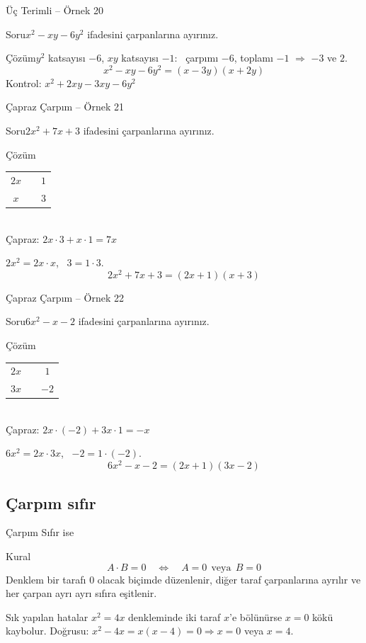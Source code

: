 \documentclass[aspectratio=169,11pt,handout]{beamer}
\newcommand{\soru}[3]{%
\begin{frame}{#1}
  \begin{block}{Soru}\large #2\end{block}
  \pause
  \begin{exampleblock}{Çözüm}\large #3\end{exampleblock}
\end{frame}}
\begin{document}
\soru{Üç Terimli -- Örnek 20}
{\(x^2-xy-6y^2\) ifadesini çarpanlarına ayırınız.}
{\(y^2\) katsayısı \(-6\), \(xy\) katsayısı \(-1\): \ çarpımı \(-6\), toplamı \(-1\) \(\Rightarrow\) \(-3\) ve \(2\).
\[x^2-xy-6y^2=(x-3y)(x+2y)\]
Kontrol: \(x^2+2xy-3xy-6y^2\) \checkmark}

\soru{Çapraz Çarpım -- Örnek 21}
{\(2x^2+7x+3\) ifadesini çarpanlarına ayırınız.}
{\begin{minipage}[t]{0.32\linewidth}
\begin{tabular}{ccc}
\(2x\) & & \(1\)\\
\(x\) & & \(3\)
\end{tabular}\\[4pt]
\normalsize Çapraz: \(2x\cdot 3+x\cdot 1=7x\) \checkmark
\end{minipage}\hfill
\begin{minipage}[t]{0.6\linewidth}
\(2x^2=2x\cdot x\), \ \(3=1\cdot 3\).
\[2x^2+7x+3=(2x+1)(x+3)\]
\end{minipage}}

\soru{Çapraz Çarpım -- Örnek 22}
{\(6x^2-x-2\) ifadesini çarpanlarına ayırınız.}
{\begin{minipage}[t]{0.32\linewidth}
\begin{tabular}{ccc}
\(2x\) & & \(1\)\\
\(3x\) & & \(-2\)
\end{tabular}\\[4pt]
\normalsize Çapraz: \(2x\cdot(-2)+3x\cdot 1=-x\) \checkmark
\end{minipage}\hfill
\begin{minipage}[t]{0.6\linewidth}
\(6x^2=2x\cdot 3x\), \ \(-2=1\cdot(-2)\).
\[6x^2-x-2=(2x+1)(3x-2)\]
\end{minipage}}

\subsection{Çarpım sıfır}
\begin{frame}{Çarpım Sıfır ise}
\begin{block}{Kural}
\[A\cdot B=0\quad\Longleftrightarrow\quad A=0\ \ \text{veya}\ \ B=0\]
Denklem bir tarafı \(0\) olacak biçimde düzenlenir, diğer taraf çarpanlarına ayrılır ve her çarpan ayrı ayrı sıfıra eşitlenir.
\end{block}
\begin{alertblock}{Sık yapılan hatalar}
\(x^2=4x\) denkleminde iki taraf \(x\)'e bölünürse \(x=0\) kökü kaybolur. Doğrusu: \(x^2-4x=x(x-4)=0\Rightarrow x=0\) veya \(x=4\).
\end{alertblock}
\end{frame}
\end{document}
